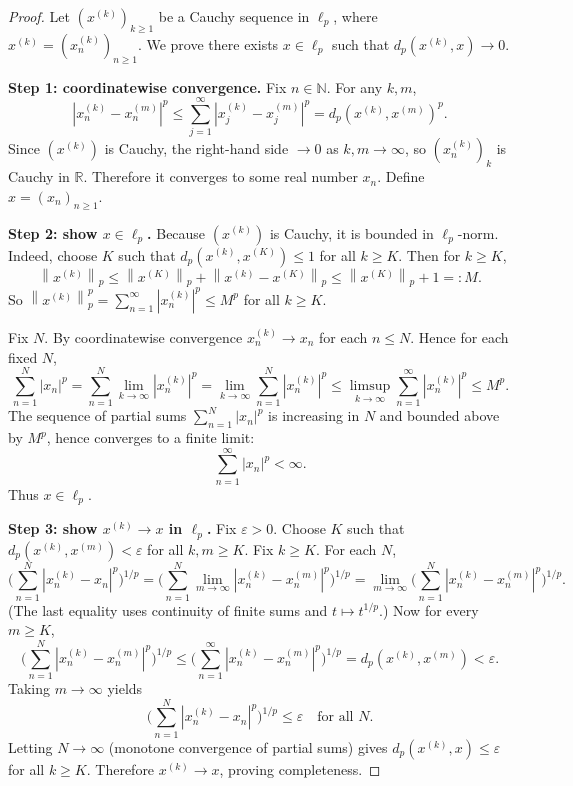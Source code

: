 \documentclass[11pt]{article}
\theoremstyle{definition}
\newcommand{\R}{\mathbb{R}}
\newcommand{\N}{\mathbb{N}}
\newcommand{\eps}{\varepsilon}
\newcommand{\norm}[1]{\left\lVert #1\right\rVert}
\begin{document}
\begin{proof}
Let $(x^{(k)})_{k\ge1}$ be a Cauchy sequence in $\ell_p$, where $x^{(k)}=(x^{(k)}_n)_{n\ge1}$.
We prove there exists $x\in\ell_p$ such that $d_p(x^{(k)},x)\to 0$.

\medskip\noindent
\textbf{Step 1: coordinatewise convergence.}
Fix $n\in\N$. For any $k,m$,
\[
|x^{(k)}_n-x^{(m)}_n|^p \le \sum_{j=1}^\infty |x^{(k)}_j-x^{(m)}_j|^p = d_p(x^{(k)},x^{(m)})^p.
\]
Since $(x^{(k)})$ is Cauchy, the right-hand side $\to 0$ as $k,m\to\infty$, so $(x^{(k)}_n)_k$ is Cauchy in $\R$.
Therefore it converges to some real number $x_n$. Define $x=(x_n)_{n\ge1}$.

\medskip\noindent
\textbf{Step 2: show $x\in\ell_p$.}
Because $(x^{(k)})$ is Cauchy, it is bounded in $\ell_p$-norm.
Indeed, choose $K$ such that $d_p(x^{(k)},x^{(K)})\le 1$ for all $k\ge K$.
Then for $k\ge K$,
\[
\norm{x^{(k)}}_p \le \norm{x^{(K)}}_p + \norm{x^{(k)}-x^{(K)}}_p \le \norm{x^{(K)}}_p+1=:M.
\]
So $\norm{x^{(k)}}_p^p=\sum_{n=1}^\infty |x^{(k)}_n|^p\le M^p$ for all $k\ge K$.

Fix $N$. By coordinatewise convergence $x^{(k)}_n\to x_n$ for each $n\le N$.
Hence for each fixed $N$,
\[
\sum_{n=1}^N |x_n|^p
=\sum_{n=1}^N \lim_{k\to\infty} |x^{(k)}_n|^p
=\lim_{k\to\infty}\sum_{n=1}^N |x^{(k)}_n|^p
\le \limsup_{k\to\infty}\sum_{n=1}^\infty |x^{(k)}_n|^p
\le M^p.
\]
The sequence of partial sums $\sum_{n=1}^N |x_n|^p$ is increasing in $N$ and bounded above by $M^p$, hence converges to a finite limit:
\[
\sum_{n=1}^\infty |x_n|^p<\infty.
\]
Thus $x\in\ell_p$.

\medskip\noindent
\textbf{Step 3: show $x^{(k)}\to x$ in $\ell_p$.}
Fix $\eps>0$. Choose $K$ such that $d_p(x^{(k)},x^{(m)})<\eps$ for all $k,m\ge K$.
Fix $k\ge K$. For each $N$,
\[
\Big(\sum_{n=1}^N |x^{(k)}_n-x_n|^p\Big)^{1/p}
=\Big(\sum_{n=1}^N \lim_{m\to\infty}|x^{(k)}_n-x^{(m)}_n|^p\Big)^{1/p}
=\lim_{m\to\infty}\Big(\sum_{n=1}^N |x^{(k)}_n-x^{(m)}_n|^p\Big)^{1/p}.
\]
(The last equality uses continuity of finite sums and $t\mapsto t^{1/p}$.)
Now for every $m\ge K$,
\[
\Big(\sum_{n=1}^N |x^{(k)}_n-x^{(m)}_n|^p\Big)^{1/p}
\le \Big(\sum_{n=1}^\infty |x^{(k)}_n-x^{(m)}_n|^p\Big)^{1/p}
=d_p(x^{(k)},x^{(m)})<\eps.
\]
Taking $m\to\infty$ yields
\[
\Big(\sum_{n=1}^N |x^{(k)}_n-x_n|^p\Big)^{1/p}\le \eps\quad\text{for all }N.
\]
Letting $N\to\infty$ (monotone convergence of partial sums) gives $d_p(x^{(k)},x)\le \eps$ for all $k\ge K$.
Therefore $x^{(k)}\to x$, proving completeness.
\end{proof}
\end{document}
